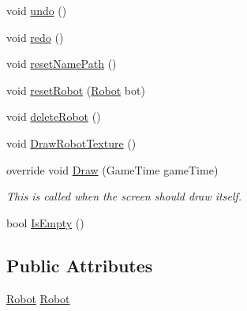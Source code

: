 \begin{DoxyCompactItemize}
\item 
void \hyperlink{classgearit_1_1src_1_1editor_1_1robot_1_1_robot_editor_a0fb130d79d46f5c48226529ccfb38400}{undo} ()
\item 
void \hyperlink{classgearit_1_1src_1_1editor_1_1robot_1_1_robot_editor_a06039e6c1b7662093c88542e04ccf755}{redo} ()
\item 
void \hyperlink{classgearit_1_1src_1_1editor_1_1robot_1_1_robot_editor_aecbcfffb5eec413fe04d6ab33b802e13}{reset\+Name\+Path} ()
\item 
void \hyperlink{classgearit_1_1src_1_1editor_1_1robot_1_1_robot_editor_a9c6d3dbeef93853247140daaa42d8935}{reset\+Robot} (\hyperlink{classgearit_1_1src_1_1robot_1_1_robot}{Robot} bot)
\item 
void \hyperlink{classgearit_1_1src_1_1editor_1_1robot_1_1_robot_editor_a73194c8e05139d0e5ebe3ce707b7da81}{delete\+Robot} ()
\item 
void \hyperlink{classgearit_1_1src_1_1editor_1_1robot_1_1_robot_editor_a00ed0618d0c552983693b8781e608ef0}{Draw\+Robot\+Texture} ()
\item 
override void \hyperlink{classgearit_1_1src_1_1editor_1_1robot_1_1_robot_editor_a7b34a8e4444147a0bda959772fd8c473}{Draw} (Game\+Time game\+Time)
\begin{DoxyCompactList}\small\item\em This is called when the screen should draw itself. \end{DoxyCompactList}\item 
bool \hyperlink{classgearit_1_1src_1_1editor_1_1robot_1_1_robot_editor_a8ad34a8c9f313ab69eda83166f33bad2}{Is\+Empty} ()
\end{DoxyCompactItemize}
\subsection*{Public Attributes}
\begin{DoxyCompactItemize}
\item 
\hyperlink{classgearit_1_1src_1_1robot_1_1_robot}{Robot} \hyperlink{classgearit_1_1src_1_1editor_1_1robot_1_1_robot_editor_a0a0b225248498a5715f672b5d78f8437}{Robot}
\end{DoxyCompactItemize}
